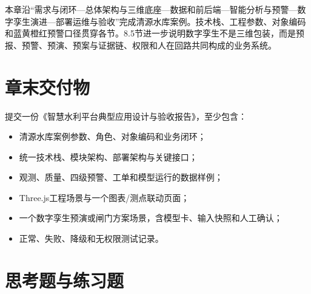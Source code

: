 本章沿“需求与闭环—总体架构与三维底座—数据和前后端—智能分析与预警—数字孪生演进—部署运维与验收”完成清源水库案例。技术栈、工程参数、对象编码和蓝黄橙红预警口径贯穿各节。8.5节进一步说明数字孪生不是三维包装，而是预报、预警、预演、预案与证据链、权限和人在回路共同构成的业务系统。

\section*{章末交付物}

提交一份《智慧水利平台典型应用设计与验收报告》，至少包含：

\begin{itemize}
\item 清源水库案例参数、角色、对象编码和业务闭环；
\item 统一技术栈、模块架构、部署架构与关键接口；
\item 观测、质量、四级预警、工单和模型运行的数据样例；
\item Three.js工程场景与一个图表/测点联动页面；
\item 一个数字孪生预演或闸门方案场景，含模型卡、输入快照和人工确认；
\item 正常、失败、降级和无权限测试记录。
\end{itemize}

\section*{思考题与练习题}


